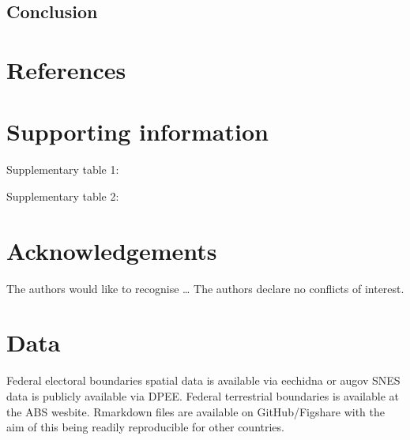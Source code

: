 \documentclass[a4paper,11pt]{article}
\begin{document}
\subsection{Conclusion}

\newpage
\nolinenumbers
\section{References}
\printbibliography

\newpage
\section{Supporting information}

Supplementary table 1:

Supplementary table 2:


\newpage
\section{Acknowledgements}
The authors would like to recognise \ldots
The authors declare no conflicts of interest.

\newpage
\section{Data}
Federal electoral boundaries spatial data is available via eechidna or augov
SNES data is publicly available via DPEE.
Federal terrestrial boundaries is available at the ABS wesbite.
Rmarkdown files are available on GitHub/Figshare with the aim of this being readily reproducible for other countries.
\end{document}
